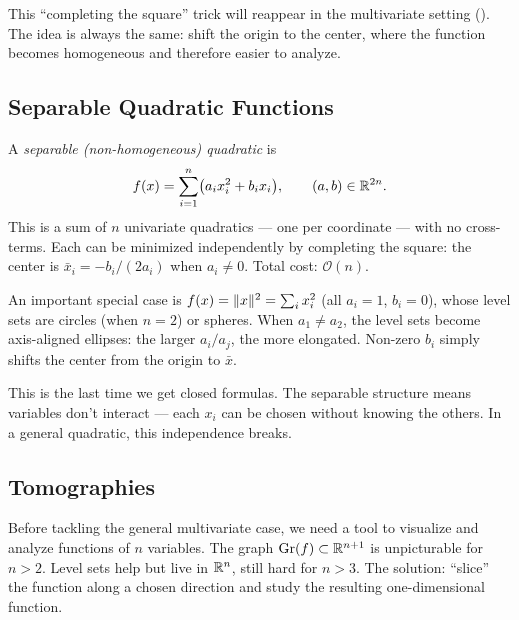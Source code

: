 \begin{rem}\label{rem:completing-square}
	This ``completing the square'' trick will reappear in the multivariate setting ().
	The idea is always the same: shift the origin to the center, where the function becomes homogeneous and therefore easier to analyze.
\end{rem}


\subsection{Separable Quadratic Functions}\label{ssec:separable-quad}

A \textit{separable (non-homogeneous) quadratic} is
\begin{equation}\label{eq:separable-quad}
	f(x) = \sum_{i=1}^{n} \bigl(a_i x_i^2 + b_i x_i\bigr),
	\qquad (a, b) \in \mathbb{R}^{2n}.
\end{equation}
This is a sum of $n$ univariate quadratics --- one per coordinate --- with no cross-terms.
Each can be minimized independently by completing the square: the center is $\bar{x}_i = -b_i / (2a_i)$ when $a_i \neq 0$.
Total cost: $\mathcal{O}(n)$.

An important special case is $f(x) = \lVert x\rVert^2 = \sum_i x_i^2$ (all $a_i = 1$, $b_i = 0$), whose level sets are circles (when $n = 2$) or spheres.
When $a_1 \neq a_2$, the level sets become axis-aligned ellipses: the larger $a_i / a_j$, the more elongated.
Non-zero $b_i$ simply shifts the center from the origin to $\bar{x}$.

This is the last time we get closed formulas.
The separable structure means variables don't interact --- each $x_i$ can be chosen without knowing the others.
In a general quadratic, this independence breaks.


\subsection{Tomographies}\label{ssec:tomographies}

Before tackling the general multivariate case, we need a tool to visualize and analyze functions of $n$ variables.
The graph $\operatorname{Gr}(f) \subset \mathbb{R}^{n+1}$ is unpicturable for $n > 2$.
Level sets help but live in $\mathbb{R}^n$, still hard for $n > 3$.
The solution: ``slice'' the function along a chosen direction and study the resulting one-dimensional function.


